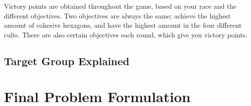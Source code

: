 Victory points are obtained throughout the game, based on your race and the different objectives. Two objectives are always the same; achieve the highest amount of cohesive hexagons, and have the highest amount in the four different cults. There are also certain objectives each round, which give you victory points. 

\subsection{Target Group Explained}

\section{Final Problem Formulation}\label{sec:finalprob}

